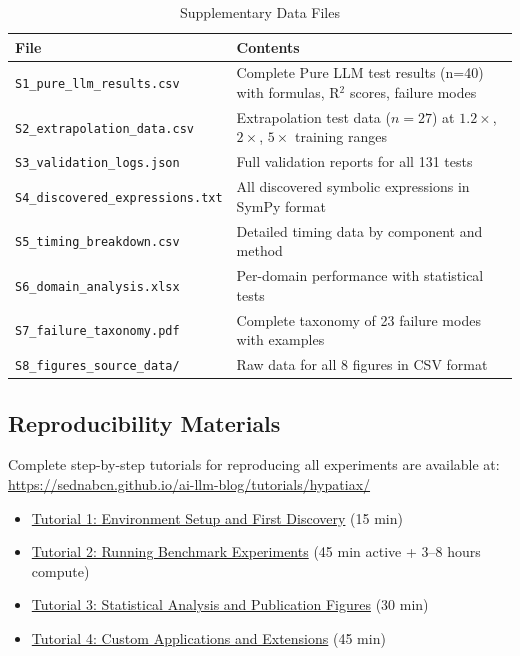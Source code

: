\documentclass[twoside,11pt]{article}
\begin{document}
\begin{table}[H]
\centering
\caption{Supplementary Data Files}
\label{tab:supplementary_files}
\small
\begin{tabular}{@{}lp{8cm}@{}}
\toprule
\textbf{File} & \textbf{Contents} \\
\midrule
\texttt{S1\_pure\_llm\_results.csv} & Complete Pure LLM test results (n=40) with formulas, R$^{2}$ scores, failure modes \\
\texttt{S2\_extrapolation\_data.csv} & Extrapolation test data ($n=27$) at $1.2\times$, $2\times$, $5\times$ training ranges \\
\texttt{S3\_validation\_logs.json} & Full validation reports for all 131 tests \\
\texttt{S4\_discovered\_expressions.txt} & All discovered symbolic expressions in SymPy format \\
\texttt{S5\_timing\_breakdown.csv} & Detailed timing data by component and method \\
\texttt{S6\_domain\_analysis.xlsx} & Per-domain performance with statistical tests \\
\texttt{S7\_failure\_taxonomy.pdf} & Complete taxonomy of 23 failure modes with examples \\
\texttt{S8\_figures\_source\_data/} & Raw data for all 8 figures in CSV format \\
\bottomrule
\end{tabular}
\end{table}

\subsection{Reproducibility Materials}

Complete step-by-step tutorials for reproducing all experiments are available at:
\url{https://sednabcn.github.io/ai-llm-blog/tutorials/hypatiax/}

\begin{itemize}
\item \href{https://sednabcn.github.io/ai-llm-blog/tutorials/hypatiax/setup/}{Tutorial 1: Environment Setup and First Discovery} (15 min)
\item \href{https://sednabcn.github.io/ai-llm-blog/tutorials/hypatiax/experiments/}{Tutorial 2: Running Benchmark Experiments} (45 min active + 3--8 hours compute)
\item \href{https://sednabcn.github.io/ai-llm-blog/tutorials/hypatiax/analysis/}{Tutorial 3: Statistical Analysis and Publication Figures} (30 min)
\item \href{https://sednabcn.github.io/ai-llm-blog/tutorials/hypatiax/extensions/}{Tutorial 4: Custom Applications and Extensions} (45 min)
\end{itemize}
\end{document}
